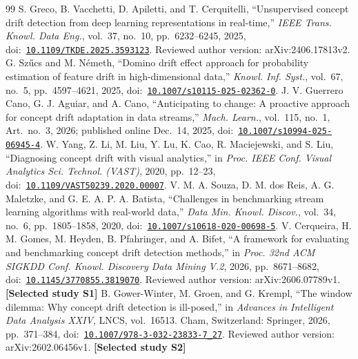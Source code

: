\documentclass[11pt,a4paper]{article}
\begin{document}
\clearpage
\renewcommand{\refname}{Academic References}
\begin{thebibliography}{99}
\small
\setlength{\itemsep}{3pt}
 S. Greco, B. Vacchetti, D. Apiletti, and T. Cerquitelli, ``Unsupervised concept drift detection from deep learning representations in real-time,'' \emph{IEEE Trans. Knowl. Data Eng.}, vol.~37, no.~10, pp.~6232--6245, 2025, doi:~\href{https://doi.org/10.1109/TKDE.2025.3593123}{\nolinkurl{10.1109/TKDE.2025.3593123}}. Reviewed author version: arXiv:2406.17813v2.
 G. Sz\H{u}cs and M. N\'emeth, ``Domino drift effect approach for probability estimation of feature drift in high-dimensional data,'' \emph{Knowl. Inf. Syst.}, vol.~67, no.~5, pp.~4597--4621, 2025, doi:~\href{https://doi.org/10.1007/s10115-025-02362-0}{\nolinkurl{10.1007/s10115-025-02362-0}}.
 J. V. Guerrero Cano, G. J. Aguiar, and A. Cano, ``Anticipating to change: A proactive approach for concept drift adaptation in data streams,'' \emph{Mach. Learn.}, vol.~115, no.~1, Art.~no.~3, 2026; published online Dec.~14, 2025, doi:~\href{https://doi.org/10.1007/s10994-025-06945-4}{\nolinkurl{10.1007/s10994-025-06945-4}}.
 W. Yang, Z. Li, M. Liu, Y. Lu, K. Cao, R. Maciejewski, and S. Liu, ``Diagnosing concept drift with visual analytics,'' in \emph{Proc. IEEE Conf. Visual Analytics Sci. Technol. (VAST)}, 2020, pp.~12--23, doi:~\href{https://doi.org/10.1109/VAST50239.2020.00007}{\nolinkurl{10.1109/VAST50239.2020.00007}}.
 V. M. A. Souza, D. M. dos Reis, A. G. Maletzke, and G. E. A. P. A. Batista, ``Challenges in benchmarking stream learning algorithms with real-world data,'' \emph{Data Min. Knowl. Discov.}, vol.~34, no.~6, pp.~1805--1858, 2020, doi:~\href{https://doi.org/10.1007/s10618-020-00698-5}{\nolinkurl{10.1007/s10618-020-00698-5}}.
 V. Cerqueira, H. M. Gomes, M. Heyden, B. Pfahringer, and A. Bifet, ``A framework for evaluating and benchmarking concept drift detection methods,'' in \emph{Proc. 32nd ACM SIGKDD Conf. Knowl. Discovery Data Mining V.2}, 2026, pp.~8671--8682, doi:~\href{https://doi.org/10.1145/3770855.3819070}{\nolinkurl{10.1145/3770855.3819070}}. Reviewed author version: arXiv:2606.07789v1. \textbf{[Selected study S1]}
 B. Gower-Winter, M. Groen, and G. Krempl, ``The window dilemma: Why concept drift detection is ill-posed,'' in \emph{Advances in Intelligent Data Analysis XXIV}, LNCS, vol.~16513. Cham, Switzerland: Springer, 2026, pp.~371--384, doi:~\href{https://doi.org/10.1007/978-3-032-23833-7_27}{\nolinkurl{10.1007/978-3-032-23833-7_27}}. Reviewed author version: arXiv:2602.06456v1. \textbf{[Selected study S2]}

\end{thebibliography}
\end{document}
